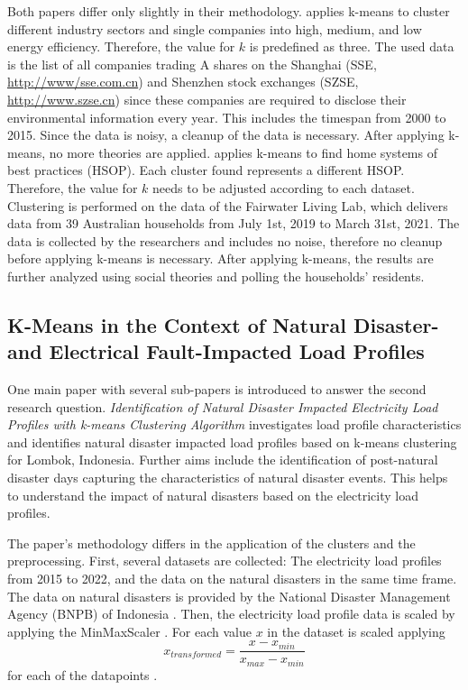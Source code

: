 Both papers differ only slightly in their methodology.
\cite{LIU-BDE} applies k-means to cluster different industry sectors and single companies into high, medium, and low energy efficiency.
Therefore, the value for $k$ is predefined as three.
The used data is the list of all companies trading A shares on the Shanghai (SSE, \url{http://www/sse.com.cn}) and Shenzhen stock exchanges (SZSE, \url{http://www.szse.cn}) since these companies are required to disclose their environmental information every year.
This includes the timespan from 2000 to 2015.
Since the data is noisy, a cleanup of the data is necessary.
After applying k-means, no more theories are applied.
\cite{MAL-HBP} applies k-means to find home systems of best practices (HSOP).
Each cluster found represents a different HSOP.
Therefore, the value for $k$ needs to be adjusted according to each dataset.
Clustering is performed on the data of the Fairwater Living Lab, which delivers data from 39 Australian households from July 1st, 2019 to March 31st, 2021. 
The data is collected by the researchers and includes no noise, therefore no cleanup before applying k-means is necessary.
After applying k-means, the results are further analyzed using social theories and polling the households' residents.


\subsection{K-Means in the Context of Natural Disaster- and Electrical Fault-Impacted Load Profiles}
One main paper with several sub-papers is introduced to answer the second research question.
\textit{Identification of Natural Disaster Impacted Electricity Load Profiles with k-means Clustering Algorithm} \cite{JES-IND} investigates load profile characteristics and identifies natural disaster impacted load profiles based on k-means clustering for Lombok, Indonesia.
Further aims include the identification of post-natural disaster days capturing the characteristics of natural disaster events.
This helps to understand the impact of natural disasters based on the electricity load profiles.

The paper's methodology differs in the application of the clusters and the preprocessing.
First, several datasets are collected: The electricity load profiles from 2015 to 2022, and the data on the natural disasters in the same time frame.
The data on natural disasters is provided by the National Disaster Management Agency (BNPB) of Indonesia \cite{BNP-CAD}.
Then, the electricity load profile data is scaled by applying the MinMaxScaler \cite{SKL-MMS}.
For each value $x$ in the dataset is scaled applying \begin{equation}\label{eq:minmaxscaler} 
      x_{transformed} = \frac{x - x_{min}}{x_{max} - x_{min}}
\end{equation} for each of the datapoints \cite{JOJ-ENP}.

